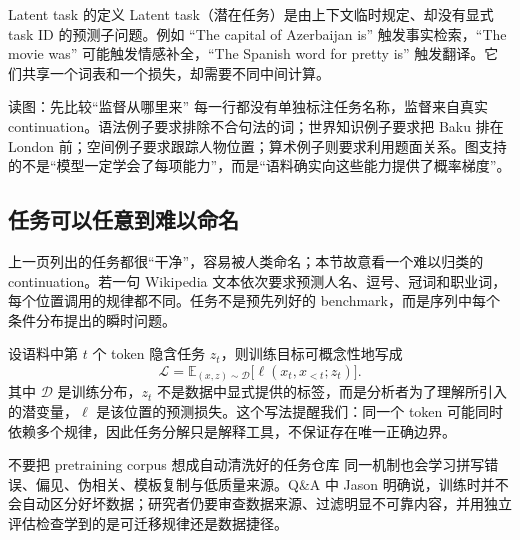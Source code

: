 \begin{importantbox}{Latent task 的定义}
Latent task（潜在任务）是由上下文临时规定、却没有显式 task ID 的预测子问题。例如 ``The capital of Azerbaijan is'' 触发事实检索，``The movie was'' 可能触发情感补全，``The Spanish word for pretty is'' 触发翻译。它们共享一个词表和一个损失，却需要不同中间计算。
\end{importantbox}


\begin{knowledgebox}{读图：先比较“监督从哪里来”}
每一行都没有单独标注任务名称，监督来自真实 continuation。语法例子要求排除不合句法的词；世界知识例子要求把 Baku 排在 London 前；空间例子要求跟踪人物位置；算术例子则要求利用题面关系。图支持的不是“模型一定学会了每项能力”，而是“语料确实向这些能力提供了概率梯度”。
\end{knowledgebox}


\subsection{任务可以任意到难以命名}

上一页列出的任务都很“干净”，容易被人类命名；本节故意看一个难以归类的 continuation。若一句 Wikipedia 文本依次要求预测人名、逗号、冠词和职业词，每个位置调用的规律都不同。任务不是预先列好的 benchmark，而是序列中每个条件分布提出的瞬时问题。


设语料中第 $t$ 个 token 隐含任务 $z_t$，则训练目标可概念性地写成
\[
\mathcal{L}=\mathbb{E}_{(x,z)\sim\mathcal{D}}\bigl[\ell(x_t,x_{<t};z_t)\bigr].
\]
其中 $\mathcal{D}$ 是训练分布，$z_t$ 不是数据中显式提供的标签，而是分析者为了理解所引入的潜变量，$\ell$ 是该位置的预测损失。这个写法提醒我们：同一个 token 可能同时依赖多个规律，因此任务分解只是解释工具，不保证存在唯一正确边界。

\begin{warningbox}{不要把 pretraining corpus 想成自动清洗好的任务仓库}
同一机制也会学习拼写错误、偏见、伪相关、模板复制与低质量来源。Q\&A 中 Jason 明确说，训练时并不会自动区分好坏数据；研究者仍要审查数据来源、过滤明显不可靠内容，并用独立评估检查学到的是可迁移规律还是数据捷径。
\end{warningbox}

